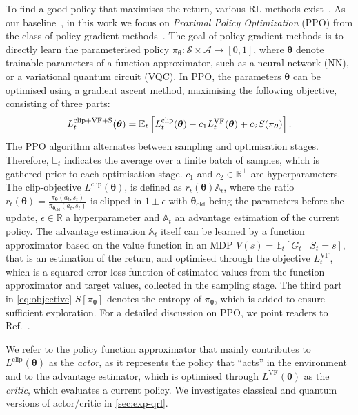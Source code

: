 \documentclass[10pt, conference]{IEEEtran}
\begin{document}
To find a good policy that maximises the return, various RL methods exist~\cite{sutton18}.
As our baseline~\cite{marcus18}, in this work we focus on \emph{Proximal Policy Optimization} (PPO) from the class of policy gradient methods~\cite{schulman17}.
The goal of policy gradient methods is to directly learn the parameterised policy $\pi_{\boldsymbol{\theta}}: \mathcal{S} \times \mathcal{A} \rightarrow [0,1]$, where $\boldsymbol{\theta}$ denote trainable parameters of a function approximator, such as a neural network (NN), or a variational quantum circuit (VQC).
In PPO, the parameters $\boldsymbol{\theta}$ can be optimised using a gradient ascent method, maximising the following objective, consisting of three parts:
%
\begin{equation}
  \label{eq:objective}
  L_t^{\text{clip}+\text{VF}+\text{S}}(\boldsymbol{\theta}) = \\
  \mathbb{E}_t\left[L_t^{\text{clip}}(\boldsymbol{\theta}) -c_1 L_t^{\text{VF}}(\boldsymbol{\theta}) + c_2 S(\pi_{\boldsymbol{\theta}})\right].
\end{equation}
%
The PPO algorithm alternates between sampling and optimisation stages. Therefore, $\mathbb{E}_t$ indicates the average over a finite batch of samples, which is gathered prior to each optimisation stage.
$c_1$ and $c_2 \in \mathbb{R}^+$ are hyperparameters.
The clip-objective $L^{\text{clip}}(\boldsymbol{\theta})$, is defined as $r_t(\boldsymbol{\theta})\mathbb{A}_t$, where the ratio $r_t(\boldsymbol{\theta}) = \frac{\pi_{\boldsymbol{\theta}}(a_t,s_t)}{\pi_{\boldsymbol{\theta}_{\text{old}}}(a_t,s_t)}$ is clipped in $1\pm \epsilon$ with $\boldsymbol{\theta}_{\text{old}}$ being the parameters before the update, $\epsilon \in \mathbb{R}$ a hyperparameter and $\mathbb{A}_t$ an advantage estimation of the current policy.
The advantage estimation $\mathbb{A}_t$ itself can be learned by a function approximator based on the value function in an MDP $V(s) = \mathbb{E}_t\left[G_t\mid S_t = s\right]$, that is an estimation of the return, and optimised through the objective $L_t^{\text{VF}}$, which is a squared-error loss function of estimated values from the function approximator and target values, collected in the sampling stage.
The third part in \autoref{eq:objective} $S[\pi_{\boldsymbol{\theta}}]$ denotes the entropy of $\pi_{\boldsymbol{\theta}}$, which is added to ensure sufficient exploration.
For a detailed discussion on PPO, we point readers to Ref.~\cite{schulman17}.

We refer to the policy function approximator that mainly contributes to $L^{\text{clip}}(\boldsymbol{\theta})$ as the \emph{actor}, as it represents the policy that \enquote{acts} in the environment and to the advantage estimator, which is optimised through $L^{\text{VF}}(\boldsymbol{\theta})$ as the \emph{critic}, which evaluates a current policy.
We investigates classical and quantum versions of actor/critic in \autoref{sec:exp-qrl}.
\end{document}
